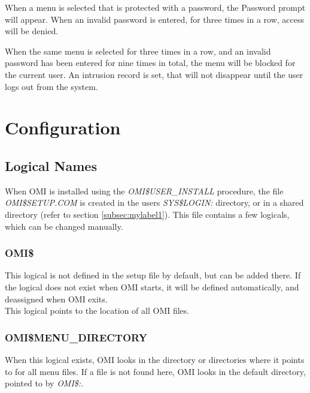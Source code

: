 \documentclass[a4paper]{book}
\newcommand{\vs}{\vspace{3mm}}
\begin{document}
When a menu is selected that is protected with a password, the Password 
prompt will appear. When an invalid password is entered, for three times in 
a row, access will be denied.

\vs

When the same menu is selected for three times in a row, and an invalid 
password has been entered for nine times in total, the menu will be blocked 
for the current user. An intrusion record is set, that will not disappear 
until the user logs out from the system.

\chapter{Configuration}
\label{sec:configuration}

\section{Logical Names}
\label{subsec:logical}

When OMI is installed using the \textsl{OMI{\$}USER{\_}INSTALL} procedure, the file 
\textsl{OMI{\$}SETUP.COM} is created in the users \textsl{SYS{\$}LOGIN:} directory, or in a 
shared directory (refer to section \ref{subsec:mylabel1}). This file 
contains a few logicals, which can be changed manually.

\subsection{OMI{\$}}
\label{subsubsec:mylabel12}

This logical is not defined in the setup file by default, but can be added 
there. If the logical does not exist when OMI starts, it will be defined 
automatically, and deassigned when OMI exits. \\
This logical points to the location of all OMI files.

\subsection{OMI{\$}MENU{\_}DIRECTORY}
\label{subsubsec:mylabel13}

When this logical exists, OMI looks in the directory or directories where it 
points to for all menu files. If a file is not found here, OMI looks in the 
default directory, pointed to by \textsl{OMI{\$}:}.
\end{document}
